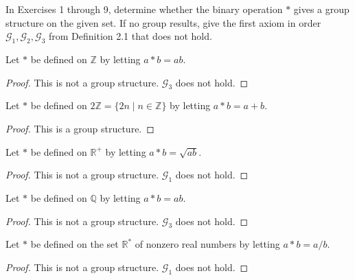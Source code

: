 In Exercises 1 through 9, determine whether the binary operation $*$ gives a group structure on the given set. If no group results, give the first axiom in order $\mathcal{G}_{1}, \mathcal{G}_{2}, \mathcal{G}_{3}$ from Definition 2.1 that does not hold.

\newpage
\begin{exercise}
    Let $*$ be defined on $\mathbb{Z}$ by letting $a * b = ab$.
\end{exercise}

\begin{proof}
    This is not a group structure. $\mathcal{G}_{3}$ does not hold.
\end{proof}

\newpage
\begin{exercise}
    Let $*$ be defined on $2\mathbb{Z} = \{ 2n \mid n\in\mathbb{Z} \}$ by letting $a * b = a + b$.
\end{exercise}

\begin{proof}
    This is a group structure.
\end{proof}

\newpage
\begin{exercise}
    Let $*$ be defined on $\mathbb{R}^{+}$ by letting $a * b = \sqrt{ab}$.
\end{exercise}

\begin{proof}
    This is not a group structure. $\mathcal{G}_{1}$ does not hold.
\end{proof}

\newpage
\begin{exercise}
    Let $*$ be defined on $\mathbb{Q}$ by letting $a * b = ab$.
\end{exercise}

\begin{proof}
    This is not a group structure. $\mathcal{G}_{3}$ does not hold.
\end{proof}

\newpage
\begin{exercise}
    Let $*$ be defined on the set $\mathbb{R}^{*}$ of nonzero real numbers by letting $a * b = a/b$.
\end{exercise}

\begin{proof}
    This is not a group structure. $\mathcal{G}_{1}$ does not hold.
\end{proof}

